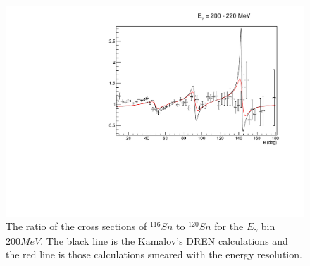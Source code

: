 \begin{figure}[H]
\begin{center}
\includegraphics[scale=0.55]{pictures/pdf/cross_ratio_kamalov_Sn116_Sn120_Ebin8.pdf}
\caption{The ratio of the cross sections of $^{116}Sn$ to $^{120}Sn$ for the $E_{\gamma}$ bin $200 MeV$. The black line is the Kamalov's DREN calculations and the red line is those calculations smeared with the energy resolution.}
\label{cross_ratio1}
\end{center}
\end{figure}

